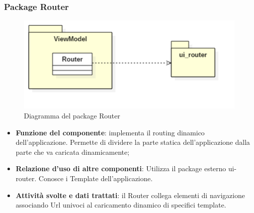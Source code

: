 \subsubsection{Package Router}
\begin{figure}[h!]
\begin{center}
	\includegraphics[scale=0.65]{../images/Router.png}
	\caption{Diagramma del package Router}
\end{center}
\end{figure}
\begin{itemize}
	\item\textbf{Funzione del componente}: implementa il routing dinamico dell'applicazione. Permette di dividere la parte statica dell'applicazione dalla parte che va caricata dinamicamente;
	\item\textbf{Relazione d'uso di altre componenti}: Utilizza il package esterno ui-router. Conosce i Template dell'applicazione.
	\item\textbf{Attività svolte e dati trattati}: il Router collega elementi di navigazione associando Url univoci al caricamento dinamico di specifici template.

\end{itemize}

\newpage